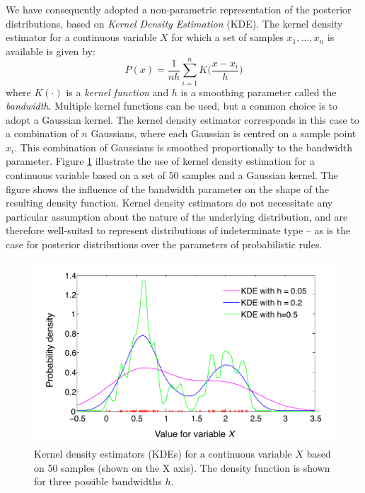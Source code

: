 We have consequently adopted a non-parametric representation of the posterior distributions, based on \textit{Kernel Density Estimation} (KDE).  The kernel density estimator for a continuous variable $X$ for which a set of samples $x_1, \dots, x_n$ is available is given by:
\begin{equation}
P(x) = \frac{1}{nh} \sum_{i=1}^n K\Big(\frac{x-x_i}{h}\Big) \label{eq:kde}
\end{equation}
where $K(\cdot)$ is a \textit{kernel function} and $h$ is a smoothing parameter called the \textit{bandwidth}. Multiple kernel functions can be used, but a common choice is to adopt a Gaussian kernel. The kernel density estimator corresponds in this case to a combination of $n$ Gaussians, where each Gaussian is centred on a sample point $x_i$.  This combination of Gaussians is smoothed proportionally to the bandwidth parameter. Figure \ref{fig:kde} illustrate the use of kernel density estimation for a continuous variable based on a set of 50 samples and a Gaussian kernel. The figure shows the influence of the bandwidth parameter on the shape of the resulting density function. Kernel density estimators do not necessitate any particular assumption about the nature of the underlying distribution, and are therefore well-suited to represent distributions of indeterminate type -- as is the case for posterior distributions over the parameters of probabilistic rules. 

\begin{figure}[h]
\centering
\includegraphics[scale=0.45]{imgs/kde.pdf} 
\caption{Kernel density estimators (KDEs) for a continuous variable $X$ based on 50 samples (shown on the X axis). The density function is shown for three possible bandwidths $h$. }
\label{fig:kde}
\end{figure}

